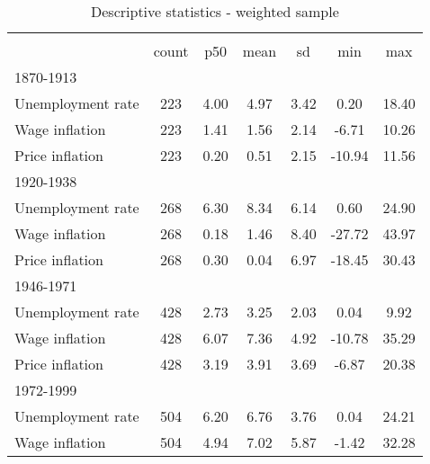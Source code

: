 \begin{table}[htbp]\centering
\def\sym#1{\ifmmode^{#1}\else\(^{#1}\)\fi}
\caption{Descriptive statistics - weighted sample \label{T:DescriptivesW}}
\begin{tabular}{l*{1}{cccccc}}
\hline\hline
                    &\multicolumn{6}{c}{}                                                         \\
                    &       count&         p50&        mean&          sd&         min&         max\\
\hline
1870-1913           &            &            &            &            &            &            \\
Unemployment rate   &         223&        4.00&        4.97&        3.42&        0.20&       18.40\\
Wage inflation      &         223&        1.41&        1.56&        2.14&       -6.71&       10.26\\
Price inflation     &         223&        0.20&        0.51&        2.15&      -10.94&       11.56\\
\hline
1920-1938           &            &            &            &            &            &            \\
Unemployment rate   &         268&        6.30&        8.34&        6.14&        0.60&       24.90\\
Wage inflation      &         268&        0.18&        1.46&        8.40&      -27.72&       43.97\\
Price inflation     &         268&        0.30&        0.04&        6.97&      -18.45&       30.43\\
\hline
1946-1971           &            &            &            &            &            &            \\
Unemployment rate   &         428&        2.73&        3.25&        2.03&        0.04&        9.92\\
Wage inflation      &         428&        6.07&        7.36&        4.92&      -10.78&       35.29\\
Price inflation     &         428&        3.19&        3.91&        3.69&       -6.87&       20.38\\
\hline
1972-1999           &            &            &            &            &            &            \\
Unemployment rate   &         504&        6.20&        6.76&        3.76&        0.04&       24.21\\
Wage inflation      &         504&        4.94&        7.02&        5.87&       -1.42&       32.28\\

\end{tabular}
\end{table}
